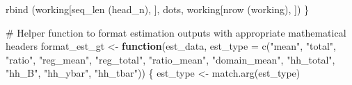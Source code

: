 \documentclass[
  letterpaper,
  DIV=11,
  numbers=noendperiod]{scrreprt}
\newenvironment{Shaded}{\begin{snugshade}}{\end{snugshade}}
\newcommand{\AttributeTok}[1]{\textcolor[rgb]{0.40,0.45,0.13}{#1}}
\newcommand{\CommentTok}[1]{\textcolor[rgb]{0.37,0.37,0.37}{#1}}
\newcommand{\ControlFlowTok}[1]{\textcolor[rgb]{0.00,0.23,0.31}{\textbf{#1}}}
\newcommand{\FunctionTok}[1]{\textcolor[rgb]{0.28,0.35,0.67}{#1}}
\newcommand{\NormalTok}[1]{\textcolor[rgb]{0.00,0.23,0.31}{#1}}
\newcommand{\OtherTok}[1]{\textcolor[rgb]{0.00,0.23,0.31}{#1}}
\newcommand{\StringTok}[1]{\textcolor[rgb]{0.13,0.47,0.30}{#1}}
\renewcommand{\[}{\begin{equation}}
\renewcommand{\]}{\end{equation}}
\begin{document}
\begin{Shaded}
\begin{Highlighting}[]
    \FunctionTok{rbind}\NormalTok{ (working[}\FunctionTok{seq\_len}\NormalTok{ (head\_n), ], dots, working[}\FunctionTok{nrow}\NormalTok{ (working), ])}
\NormalTok{\}}

\CommentTok{\# Helper function to format estimation outputs with appropriate mathematical headers}
\NormalTok{format\_est\_gt }\OtherTok{\textless{}{-}} \ControlFlowTok{function}\NormalTok{(est\_data, }\AttributeTok{est\_type =} \FunctionTok{c}\NormalTok{(}\StringTok{"mean"}\NormalTok{, }\StringTok{"total"}\NormalTok{, }\StringTok{"ratio"}\NormalTok{, }\StringTok{"reg\_mean"}\NormalTok{, }\StringTok{"reg\_total"}\NormalTok{, }\StringTok{"ratio\_mean"}\NormalTok{, }\StringTok{"domain\_mean"}\NormalTok{,}
                                                 \StringTok{"hh\_total"}\NormalTok{, }\StringTok{"hh\_B"}\NormalTok{, }\StringTok{"hh\_ybar"}\NormalTok{, }\StringTok{"hh\_tbar"}\NormalTok{)) \{}
\NormalTok{  est\_type }\OtherTok{\textless{}{-}} \FunctionTok{match.arg}\NormalTok{(est\_type)}


\end{Highlighting}
\end{Shaded}
\end{document}
